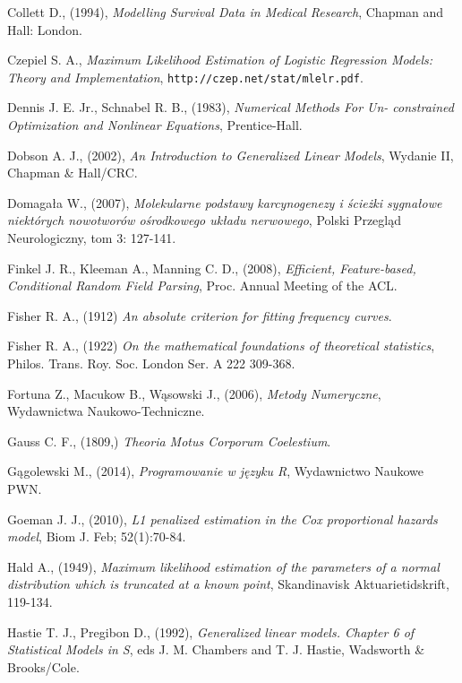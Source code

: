 \begin{thebibliography}{99}
 Collett D., (1994), \textit{Modelling Survival Data in Medical Research}, Chapman and Hall:
London.

 Czepiel S. A., \textit{Maximum Likelihood Estimation of Logistic Regression Models: Theory and Implementation}, \texttt{http://czep.net/stat/mlelr.pdf}.

 Dennis J. E. Jr., Schnabel R. B., (1983), \textit{Numerical Methods For Un-
constrained Optimization and Nonlinear Equations}, Prentice-Hall.

 Dobson A. J., (2002), \textit{An Introduction to Generalized Linear Models}, Wydanie II, Chapman \& Hall/CRC.

 Domagała W., (2007), \textit{Molekularne podstawy karcynogenezy i ścieżki sygnałowe niektórych nowotworów ośrodkowego układu nerwowego}, Polski Przegląd Neurologiczny, tom 3: 127-141.

  Finkel J. R., Kleeman A., Manning C. D., (2008), \textit{Efficient, Feature-based, Conditional Random Field Parsing}, Proc. Annual Meeting of the ACL.

 Fisher R. A., (1912) \textit{An absolute criterion for fitting frequency curves}.

 Fisher R. A., (1922) \textit{On the mathematical foundations of theoretical statistics}, Philos. Trans. Roy. Soc. London Ser. A 222 309-368.

 Fortuna Z., Macukow B., Wąsowski J., (2006), \textit{Metody Numeryczne}, Wydawnictwa Naukowo-Techniczne.

 Gauss C. F., (1809,) \textit{Theoria Motus Corporum Coelestium}.

 Gągolewski M., (2014), \textit{Programowanie w języku R}, Wydawnictwo Naukowe PWN.

 Goeman J. J., (2010), \textit{L1 penalized estimation in the Cox proportional hazards model}, Biom J. Feb; 52(1):70-84.


 Hald A., (1949), \textit{Maximum likelihood estimation of the parameters of a normal distribution which is truncated at a known point}, Skandinavisk Aktuarietidskrift, 119-134.


 Hastie T. J., Pregibon D., (1992), \textit{Generalized linear models. Chapter 6 of Statistical Models in S}, eds J. M. Chambers and T. J. Hastie, Wadsworth \& Brooks/Cole.



\end{thebibliography}
